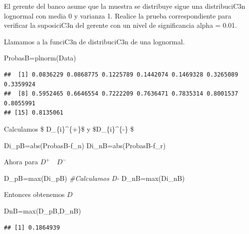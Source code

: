 \documentclass[
]{article}
\newenvironment{Shaded}{\begin{snugshade}}{\end{snugshade}}
\newcommand{\CommentTok}[1]{\textcolor[rgb]{0.56,0.35,0.01}{\textit{#1}}}
\newcommand{\FunctionTok}[1]{\textcolor[rgb]{0.00,0.00,0.00}{#1}}
\newcommand{\NormalTok}[1]{#1}
\newcommand{\OtherTok}[1]{\textcolor[rgb]{0.56,0.35,0.01}{#1}}
\newcommand{\SpecialCharTok}[1]{\textcolor[rgb]{0.00,0.00,0.00}{#1}}
\begin{document}
El gerente del banco asume que la muestra se distribuye sigue una
distribuciC3n lognormal con media 0 y varianza 1. Realice la prueba
correspondiente para verificar la suposiciC3n del gerente con un nivel
de significancia alpha = 0.01.

Llamamos a la funciC3n de distribuciC3n de una lognormal.

\begin{Shaded}
\begin{Highlighting}[]
\NormalTok{ProbasB}\OtherTok{=}\FunctionTok{plnorm}\NormalTok{(Data) }
\end{Highlighting}
\end{Shaded}

\begin{verbatim}
##  [1] 0.0836229 0.0868775 0.1225789 0.1442074 0.1469328 0.3265089 0.3359924
##  [8] 0.5952465 0.6646554 0.7222209 0.7636471 0.7835314 0.8001537 0.8055991
## [15] 0.8135061
\end{verbatim}

Calculamos \$ D\_\{i\}\^{}\{+\}\$ y \$D\_\{i\}\^{}\{-\} \$

\begin{Shaded}
\begin{Highlighting}[]
\NormalTok{Di\_pB}\OtherTok{=}\FunctionTok{abs}\NormalTok{(ProbasB}\SpecialCharTok{{-}}\NormalTok{f\_n)}
\NormalTok{Di\_nB}\OtherTok{=}\FunctionTok{abs}\NormalTok{(ProbasB}\SpecialCharTok{{-}}\NormalTok{f\_r)}
\end{Highlighting}
\end{Shaded}

Ahora para \(D^{+} \quad D^{-}\)

\begin{Shaded}
\begin{Highlighting}[]
\NormalTok{D\_pB}\OtherTok{=}\FunctionTok{max}\NormalTok{(Di\_pB)}
\CommentTok{\#Calculamos D{-}}
\NormalTok{D\_nB}\OtherTok{=}\FunctionTok{max}\NormalTok{(Di\_nB)}
\end{Highlighting}
\end{Shaded}

Entonces obtenemos \(D\)

\begin{Shaded}
\begin{Highlighting}[]
\NormalTok{DnB}\OtherTok{=}\FunctionTok{max}\NormalTok{(D\_pB,D\_nB)}
\end{Highlighting}
\end{Shaded}

\begin{verbatim}
## [1] 0.1864939
\end{verbatim}
\end{document}
